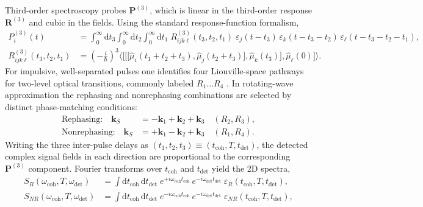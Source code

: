 Third-order spectroscopy probes $\boldsymbol{P}^{(3)}$, which is linear in the third-order response $\boldsymbol{R}^{(3)}$ and cubic in the fields. Using the standard response-function formalism,
\begin{align}
    P_i^{(3)}(t)                      & = \int_0^\infty\!\!\mathrm{d}t_3 \int_0^\infty\!\!\mathrm{d}t_2 \int_0^\infty\!\!\mathrm{d}t_1\;
    R^{(3)}_{i j k \ell}(t_3,t_2,t_1)\;
    \varepsilon_j(t-t_3)\,\varepsilon_k(t-t_3-t_2)\,\varepsilon_\ell(t-t_3-t_2-t_1), \label{final:eq:P3_conv}                            \\
    R^{(3)}_{i j k \ell}(t_3,t_2,t_1) & =
    \left(-\frac{i}{\hbar}\right)^3
    \big\langle
    \big[\!\big[\!\big[\hat{\mu}_i(t_1{+}t_2{+}t_3),\hat{\mu}_j(t_2{+}t_3)\big],\hat{\mu}_k(t_3)\big],\hat{\mu}_\ell(0)\big]
    \big\rangle. \label{final:eq:R3_def}
\end{align}
For impulsive, well-separated pulses one identifies four Liouville-space pathways for two-level optical transitions, commonly labeled $R_{1}\ldots R_{4}$ \cite{mukamel1995principlesnonlinearoptical, cho2009twodimensionalopticalspectroscopy}. In rotating-wave approximation the rephasing and nonrephasing combinations are selected by distinct phase-matching conditions:
\begin{align}
    \text{Rephasing:}\quad \boldsymbol{k}_S    & = -\boldsymbol{k}_1+\boldsymbol{k}_2+\boldsymbol{k}_3 \quad (R_2,R_3), \\
    \text{Nonrephasing:}\quad \boldsymbol{k}_S & = +\boldsymbol{k}_1-\boldsymbol{k}_2+\boldsymbol{k}_3 \quad (R_1,R_4).
\end{align}
Writing the three inter-pulse delays as $(t_1,t_2,t_3)\equiv(t_{\mathrm{coh}},T,t_{\mathrm{det}})$, the detected complex signal fields in each direction are proportional to the corresponding $\boldsymbol{P}^{(3)}$ component. Fourier transforms over $t_{\mathrm{coh}}$ and $t_{\mathrm{det}}$ yield the 2D spectra,
\begin{align}
    S_{R}(\omega_{\mathrm{coh}},T,\omega_{\mathrm{det}})
     & =\int \mathrm{d}t_{\mathrm{coh}}\,\mathrm{d}t_{\mathrm{det}}\;
    e^{+i\omega_{\mathrm{coh}} t_{\mathrm{coh}}}\,e^{-i\omega_{\mathrm{det}} t_{\mathrm{det}}}\;\varepsilon_{R}(t_{\mathrm{coh}},T,t_{\mathrm{det}}), \label{final:eq:SR} \\
    S_{NR}(\omega_{\mathrm{coh}},T,\omega_{\mathrm{det}})
     & =\int \mathrm{d}t_{\mathrm{coh}}\,\mathrm{d}t_{\mathrm{det}}\;
    e^{-i\omega_{\mathrm{coh}} t_{\mathrm{coh}}}\,e^{-i\omega_{\mathrm{det}} t_{\mathrm{det}}}\;\varepsilon_{NR}(t_{\mathrm{coh}},T,t_{\mathrm{det}}), \label{final:eq:SNR}
\end{align}

